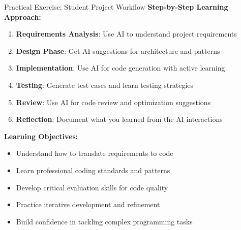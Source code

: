 \documentclass{beamer}
\begin{document}
\begin{frame}[t]{Practical Exercise: Student Project Workflow}
    \textbf{Step-by-Step Learning Approach:}
    
    \begin{enumerate}
        \item \textbf{Requirements Analysis}: Use AI to understand project requirements
        \item \textbf{Design Phase}: Get AI suggestions for architecture and patterns
        \item \textbf{Implementation}: Use AI for code generation with active learning
        \item \textbf{Testing}: Generate test cases and learn testing strategies
        \item \textbf{Review}: Use AI for code review and optimization suggestions
        \item \textbf{Reflection}: Document what you learned from the AI interactions
    \end{enumerate}
    
    \textbf{Learning Objectives:}
    \begin{itemize}
        \item Understand how to translate requirements to code
        \item Learn professional coding standards and patterns
        \item Develop critical evaluation skills for code quality
        \item Practice iterative development and refinement
        \item Build confidence in tackling complex programming tasks
    \end{itemize}
\end{frame}
\end{document}
